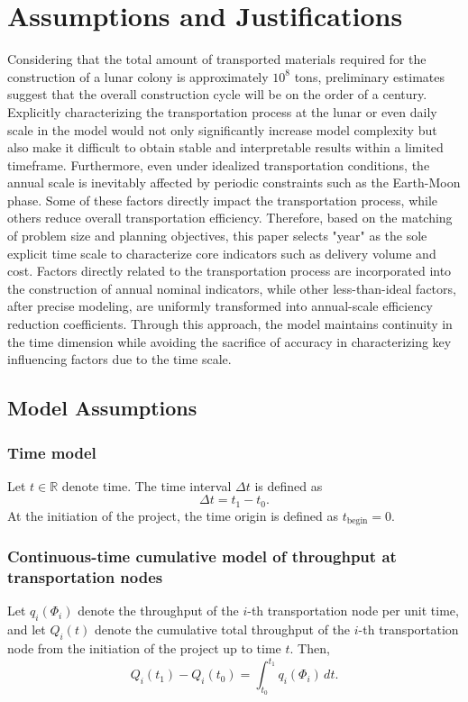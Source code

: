 \documentclass[12pt]{article}
\begin{document}
\section{Assumptions and Justifications}

Considering that the total amount of transported materials required for the construction of a lunar colony is approximately $10^8$ tons, preliminary estimates suggest that the overall construction cycle will be on the order of a century. Explicitly characterizing the transportation process at the lunar or even daily scale in the model would not only significantly increase model complexity but also make it difficult to obtain stable and interpretable results within a limited timeframe. Furthermore, even under idealized transportation conditions, the annual scale is inevitably affected by periodic constraints such as the Earth-Moon phase. Some of these factors directly impact the transportation process, while others reduce overall transportation efficiency. Therefore, based on the matching of problem size and planning objectives, this paper selects "year" as the sole explicit time scale to characterize core indicators such as delivery volume and cost. Factors directly related to the transportation process are incorporated into the construction of annual nominal indicators, while other less-than-ideal factors, after precise modeling, are uniformly transformed into annual-scale efficiency reduction coefficients. Through this approach, the model maintains continuity in the time dimension while avoiding the sacrifice of accuracy in characterizing key influencing factors due to the time scale.

\subsection{Model Assumptions}
\subsubsection{Time model}
Let $t \in \mathbb{R}$ denote time. The time interval $\Delta t$ is defined as
\[
\Delta t = t_1 - t_0 .
\]
At the initiation of the project, the time origin is defined as $t_{\text{begin}} = 0$.

\subsubsection{Continuous-time cumulative model of throughput at transportation nodes}
Let $q_i(\Phi_i)$ denote the throughput of the $i$-th transportation node per unit time, and let $Q_i(t)$ denote the cumulative total throughput of the $i$-th transportation node from the initiation of the project up to time $t$. Then,
\[
Q_i(t_1) - Q_i(t_0) = \int_{t_0}^{t_1} q_i(\Phi_i)\, dt .
\]
\end{document}
